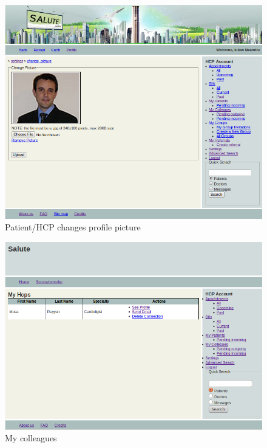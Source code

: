 \begin{figure}
\includegraphics[scale=0.6]{screenshots/change_picture.png}
\caption{Patient/HCP changes profile picture}
\end{figure}

\begin{figure}
\includegraphics[scale=0.6]{screenshots/my_colleagues.png}
\caption{My colleagues}
\end{figure}

